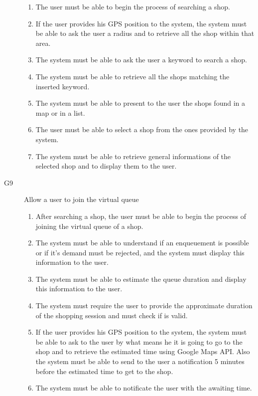 \begin{description}
        \begin{enumerate}[resume*]
            \item The user must be able to begin the process of searching a shop.
            \item If the user provides his GPS position to the system, the system must be able to ask the user a radius and to retrieve all the shop within that area.
            \item The system must be able to ask the user a keyword to search a shop.
            \item The system must be able to retrieve all the shops matching the inserted keyword.
            \item The system must be able to present to the user the shops found in a map or in a list.
            \item The user must be able to select a shop from the ones provided by the system.
            \item The system must be able to retrieve general informations of the selected shop and to display them to the user.
        \end{enumerate}
    \item [G9] Allow a user to join the virtual queue
        \begin{enumerate}[resume*]
            \item After searching a shop, the user must be able to begin the process of joining the virtual queue of a shop.
            \item The system must be able to understand if an enqueuement is possible or if it’s demand must be rejected, and the system must display this information to the user.
            \item The system must be able to estimate the queue duration and display this information to the user.
            \item The system must require the user to provide the approximate duration of the shopping session and must check if is valid.
            \item If the user provides his GPS position to the system, the system must be able to ask to the user by what means he it is going to go to the shop and to retrieve the estimated time using Google Maps API. Also the system must be able to send to the user a notification 5 minutes before the estimated time to get to the shop.
            \item The system must be able to notificate the user with the awaiting time.
        \end{enumerate}

\end{description}
